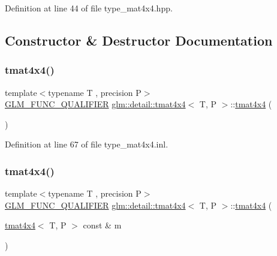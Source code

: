 Definition at line 44 of file type\+\_\+mat4x4.\+hpp.



\subsection{Constructor \& Destructor Documentation}
\mbox{\label{structglm_1_1detail_1_1tmat4x4_a71d7b76eb0998b0a5e3a0b2fa180bdaa}} 
\subsubsection{\texorpdfstring{tmat4x4()}{tmat4x4()}\hspace{0.1cm}{\footnotesize\ttfamily [1/22]}}
{\footnotesize\ttfamily template$<$typename T , precision P$>$ \\
\hyperlink{setup_8hpp_a33fdea6f91c5f834105f7415e2a64407}{G\+L\+M\+\_\+\+F\+U\+N\+C\+\_\+\+Q\+U\+A\+L\+I\+F\+I\+ER} \hyperlink{structglm_1_1detail_1_1tmat4x4}{glm\+::detail\+::tmat4x4}$<$ T, P $>$\+::\hyperlink{structglm_1_1detail_1_1tmat4x4}{tmat4x4} (\begin{DoxyParamCaption}{ }\end{DoxyParamCaption})}



Definition at line 67 of file type\+\_\+mat4x4.\+inl.

\mbox{\label{structglm_1_1detail_1_1tmat4x4_a10821dfc2a11592b00c0504964af9a30}} 
\subsubsection{\texorpdfstring{tmat4x4()}{tmat4x4()}\hspace{0.1cm}{\footnotesize\ttfamily [2/22]}}
{\footnotesize\ttfamily template$<$typename T , precision P$>$ \\
\hyperlink{setup_8hpp_a33fdea6f91c5f834105f7415e2a64407}{G\+L\+M\+\_\+\+F\+U\+N\+C\+\_\+\+Q\+U\+A\+L\+I\+F\+I\+ER} \hyperlink{structglm_1_1detail_1_1tmat4x4}{glm\+::detail\+::tmat4x4}$<$ T, P $>$\+::\hyperlink{structglm_1_1detail_1_1tmat4x4}{tmat4x4} (\begin{DoxyParamCaption}\item[{\hyperlink{structglm_1_1detail_1_1tmat4x4}{tmat4x4}$<$ T, P $>$ const \&}]{m }\end{DoxyParamCaption})}



